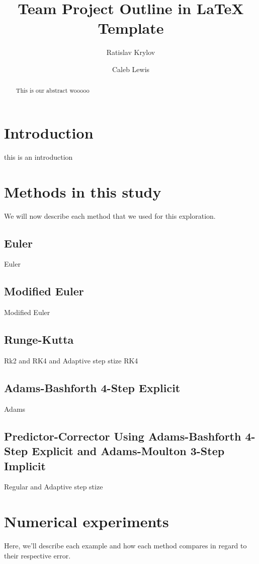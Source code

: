 \documentclass[11pt]{article}
\title{Team Project Outline in LaTeX Template}
\author{Ratislav Krylov \and Caleb Lewis}
\begin{document}
\maketitle

\begin{abstract}
This is our abstract wooooo
\end{abstract}

\section{Introduction}
this is an introduction

\section{Methods in this study}
We will now describe each method that we used for this exploration.

\subsection{Euler}
Euler

\subsection{Modified Euler}
Modified Euler

\subsection{Runge-Kutta}
Rk2 and RK4 and Adaptive step stize RK4

\subsection{Adams-Bashforth 4-Step Explicit}
Adams

\subsection{Predictor-Corrector Using Adams-Bashforth 4-Step Explicit and Adams-Moulton 3-Step Implicit}
Regular and Adaptive step stize

\section{Numerical experiments}
Here, we'll describe each example and how each method compares in regard to their respective error.
\end{document}
